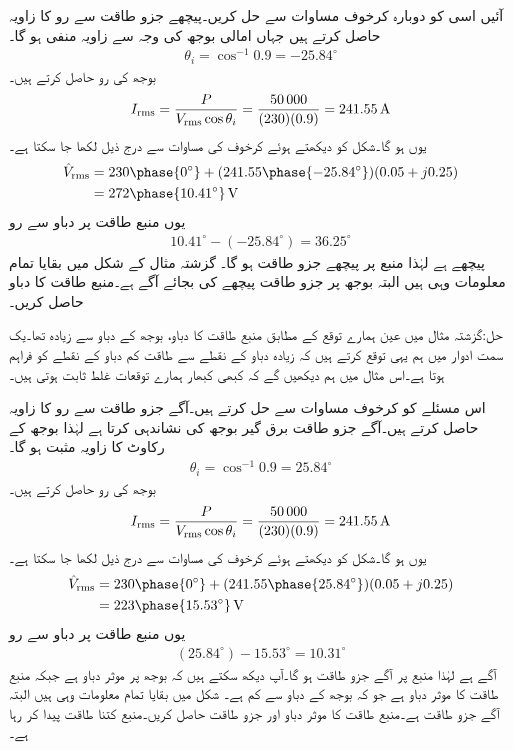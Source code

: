 آئیں اسی کو دوبارہ کرخوف مساوات سے حل کریں۔پیچھے جزو طاقت  سے رو کا زاویہ حاصل کرتے ہیں جہاں امالی بوجھ کی وجہ سے زاویہ منفی ہو گا۔
\begin{align*}
\theta_i=\cos^{-1} 0.9=-25.84^{\circ}
\end{align*}
بوجھ کی رو حاصل کرتے ہیں۔
\begin{align*}
{\ensuremath{I_{\textup{rms}}}}=\frac{P}{{V_{\textup{rms}}} \cos \theta_i}=\frac{\num{50000}}{(230)(0.9)}=\SI{241.55}{\ampere}
\end{align*}
یوں  ہو گا۔شکل کو دیکھتے ہوئے کرخوف کی مساوات سے درج ذیل لکھا جا سکتا ہے۔
\begin{align*}
\hat{V}_{\textup{rms}}&=230\phase{0^{\circ}}+(241.55\phase{-25.84^{\circ}})(0.05+j0.25)\\
&=272\phase{10.41^{\circ}}\,\si{\volt}
\end{align*}
یوں منبع طاقت پر دباو سے رو
\begin{align*}
10.41^{\circ}-(-25.84^{\circ})=36.25^{\circ}
\end{align*}
پیچھے ہے لہٰذا منبع پر پیچھے جزو طاقت  ہو گا۔
گزشتہ مثال کے شکل  میں بقایا تمام معلومات وہی ہیں البتہ بوجھ پر جزو طاقت پیچھے کی بجائے آگے ہے۔منبع طاقت کا دباو حاصل کریں۔

حل:گزشتہ مثال میں عین ہمارے توقع کے مطابق منبع طاقت کا دباو، بوجھ کے دباو سے زیادہ تھا۔یک سمت ادوار میں ہم یہی توقع کرتے ہیں کہ زیادہ دباو کے نقطے سے طاقت  کم دباو کے نقطے  کو فراہم ہوتا ہے۔اس مثال میں ہم دیکھیں گے کہ کبھی کبھار ہمارے توقعات غلط ثابت ہوتی ہیں۔ 
 
اس مسئلے کو کرخوف مساوات سے حل کرتے ہیں۔آگے جزو طاقت  سے رو کا زاویہ حاصل کرتے ہیں۔آگے جزو طاقت برق گیر بوجھ کی نشاندہی کرتا ہے لہٰذا بوجھ کے رکاوٹ کا زاویہ مثبت ہو گا۔
\begin{align*}
\theta_i=\cos^{-1} 0.9=25.84^{\circ}
\end{align*}
بوجھ کی رو حاصل کرتے ہیں۔
\begin{align*}
{\ensuremath{I_{\textup{rms}}}}=\frac{P}{{V_{\textup{rms}}} \cos \theta_i}=\frac{\num{50000}}{(230)(0.9)}=\SI{241.55}{\ampere}
\end{align*}
یوں  ہو گا۔شکل کو دیکھتے ہوئے کرخوف کی مساوات سے درج ذیل لکھا جا سکتا ہے۔
\begin{align*}
\hat{V}_{\textup{rms}}&=230\phase{0^{\circ}}+(241.55\phase{25.84^{\circ}})(0.05+j0.25)\\
&=223\phase{15.53^{\circ}}\,\si{\volt}
\end{align*}
یوں منبع طاقت پر دباو سے رو
\begin{align*}
(25.84^{\circ})-15.53^{\circ}=10.31^{\circ}
\end{align*}
آگے  ہے لہٰذا منبع پر آگے جزو طاقت  ہو گا۔آپ دیکھ سکتے ہیں کہ بوجھ پر موثر دباو  ہے جبکہ منبع طاقت کا موثر دباو  ہے جو کہ بوجھ کے دباو سے کم ہے۔
شکل  میں بقایا تمام معلومات وہی ہیں البتہ آگے جزو طاقت  ہے۔منبع طاقت کا موثر دباو اور جزو طاقت حاصل کریں۔منبع کتنا طاقت پیدا کر رہا ہے۔

